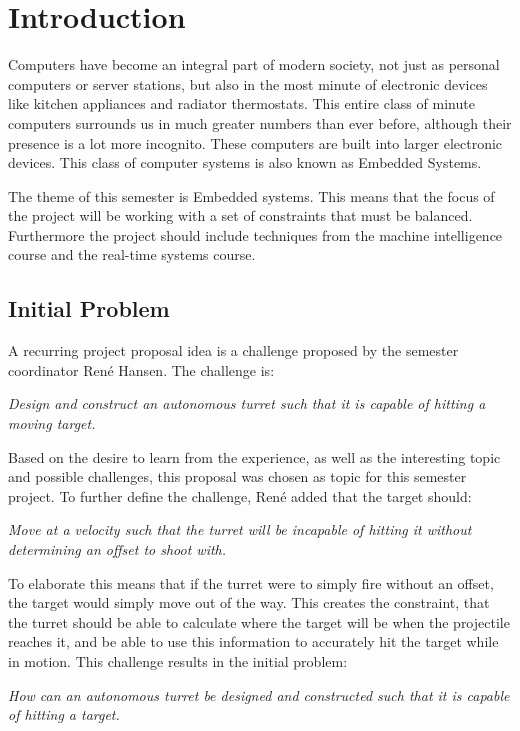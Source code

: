 \chapter{Introduction}
Computers have become an integral part of modern society, not just as personal
computers or server stations, but also in the most minute of electronic devices
like kitchen appliances and radiator thermostats. This entire class of minute
computers surrounds us in much greater numbers than ever before, although their
presence is a lot more incognito. These computers are built into larger
electronic devices. This class of computer systems is also known as Embedded
Systems.\nl

The theme of this semester is Embedded systems. This means that the focus of
the project will be working with a set of constraints that must be balanced.
Furthermore the project should include techniques from the machine intelligence
course and the real-time systems course.

\section{Initial Problem}
A recurring project proposal idea is a challenge proposed by the semester coordinator Ren\'e
Hansen. The challenge is:

\begin{center}
\begin{minipage}{0.8\linewidth}
\textit{Design and construct an autonomous turret such that it is capable of
hitting a moving target.}
\end{minipage}
\end{center}

Based on the desire to learn from the experience, as well as the interesting
topic and possible challenges, this proposal was chosen as topic for this
semester project. To further define the challenge, Ren\'e added that the target
should:
\begin{center}
\begin{minipage}{0.8\linewidth}
\textit{Move at a velocity such that the turret will be incapable
of hitting it without determining an offset to shoot with.}
\end{minipage}
\end{center}

To elaborate this means that if the turret were to simply fire without an
offset, the target would simply move out of the way. This creates the
constraint, that the turret should be able to calculate where the target will be
when the projectile reaches it, and be able to use this information to
accurately hit the target while in motion. This challenge results in the initial
problem:

\begin{center}
\begin{minipage}{0.8\linewidth}
\textit{How can an autonomous turret be designed and constructed such that it is
capable of hitting a target.}
\end{minipage}
\end{center}
